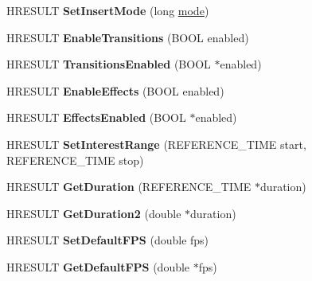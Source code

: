 \begin{DoxyCompactItemize}
H\+R\+E\+S\+U\+LT {\bfseries Set\+Insert\+Mode} (long \hyperlink{interfacevoid}{mode})
\item 
\mbox{\label{interface_i_a_m_timeline_a0b7c45b541b13f79b3038e2e552ca968}} 
H\+R\+E\+S\+U\+LT {\bfseries Enable\+Transitions} (B\+O\+OL enabled)
\item 
\mbox{\label{interface_i_a_m_timeline_a51f1adc9a31830b02ea40311c6a6c3d1}} 
H\+R\+E\+S\+U\+LT {\bfseries Transitions\+Enabled} (B\+O\+OL $\ast$enabled)
\item 
\mbox{\label{interface_i_a_m_timeline_ad9b6eb692575f81ce51315f7f880640e}} 
H\+R\+E\+S\+U\+LT {\bfseries Enable\+Effects} (B\+O\+OL enabled)
\item 
\mbox{\label{interface_i_a_m_timeline_ae0dd84eafcd347b7aaa079124c4435a5}} 
H\+R\+E\+S\+U\+LT {\bfseries Effects\+Enabled} (B\+O\+OL $\ast$enabled)
\item 
\mbox{\label{interface_i_a_m_timeline_ab778eceaededc08fca68d5f205abe724}} 
H\+R\+E\+S\+U\+LT {\bfseries Set\+Interest\+Range} (R\+E\+F\+E\+R\+E\+N\+C\+E\+\_\+\+T\+I\+ME start, R\+E\+F\+E\+R\+E\+N\+C\+E\+\_\+\+T\+I\+ME stop)
\item 
\mbox{\label{interface_i_a_m_timeline_ac633b13f11c963295aed1c5f15382bac}} 
H\+R\+E\+S\+U\+LT {\bfseries Get\+Duration} (R\+E\+F\+E\+R\+E\+N\+C\+E\+\_\+\+T\+I\+ME $\ast$duration)
\item 
\mbox{\label{interface_i_a_m_timeline_aa0e76b7bdb52bf56dc4a3d6c2da886c7}} 
H\+R\+E\+S\+U\+LT {\bfseries Get\+Duration2} (double $\ast$duration)
\item 
\mbox{\label{interface_i_a_m_timeline_a737e69610ac1f8d97015f0d2e346befc}} 
H\+R\+E\+S\+U\+LT {\bfseries Set\+Default\+F\+PS} (double fps)
\item 
\mbox{\label{interface_i_a_m_timeline_ae6af9da0c1b5423b8adae5f64ee1dfa7}} 
H\+R\+E\+S\+U\+LT {\bfseries Get\+Default\+F\+PS} (double $\ast$fps)
\item 

\end{DoxyCompactItemize}
